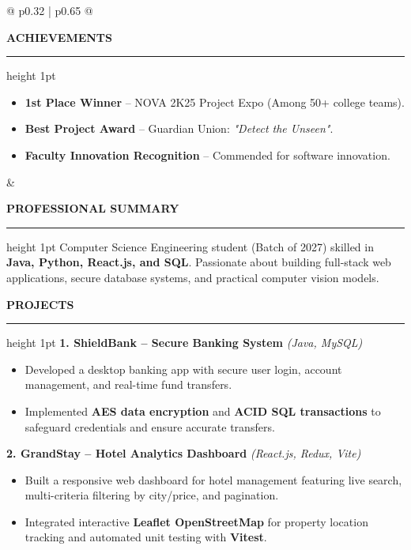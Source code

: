 \documentclass[a4paper,10pt]{article}
\begin{document}
\begin{mdframed}[style=resumebox]
\begin{tabularx}{\textwidth}{@{} p{0.32\textwidth} | p{0.65\textwidth} @{}}
\begin{minipage}[t]{\linewidth}
    \vspace{8pt}
    \textbf{\color{primaryblack}\large ACHIEVEMENTS}
    \vspace{2pt}\hrule height 1pt\vspace{3pt}
    \begin{itemize}
        \item \textbf{1st Place Winner} -- NOVA 2K25 Project Expo (Among 50+ college teams).
        \item \textbf{Best Project Award} -- Guardian Union: \textit{"Detect the Unseen"}.
        \item \textbf{Faculty Innovation Recognition} -- Commended for software innovation.
    \end{itemize}
\end{minipage}
&
\begin{minipage}[t]{\linewidth}
    \textbf{\color{primaryblack}\large PROFESSIONAL SUMMARY}
    \vspace{2pt}\hrule height 1pt\vspace{3pt}
    \small
    Computer Science Engineering student (Batch of 2027) skilled in \textbf{Java, Python, React.js, and SQL}. Passionate about building full-stack web applications, secure database systems, and practical computer vision models.

    \vspace{6pt}
    \textbf{\color{primaryblack}\large PROJECTS}
    \vspace{2pt}\hrule height 1pt\vspace{3pt}
    \textbf{1. ShieldBank -- Secure Banking System} \hfill \textit{\footnotesize (Java, MySQL)}\\
    \begin{itemize}
        \item Developed a desktop banking app with secure user login, account management, and real-time fund transfers.
        \item Implemented \textbf{AES data encryption} and \textbf{ACID SQL transactions} to safeguard credentials and ensure accurate transfers.
    \end{itemize}
    \vspace{2pt}\dotfill\vspace{2pt}

    \textbf{2. GrandStay -- Hotel Analytics Dashboard} \hfill \textit{\footnotesize (React.js, Redux, Vite)}\\
    \begin{itemize}
        \item Built a responsive web dashboard for hotel management featuring live search, multi-criteria filtering by city/price, and pagination.
        \item Integrated interactive \textbf{Leaflet OpenStreetMap} for property location tracking and automated unit testing with \textbf{Vitest}.
    \end{itemize}
    \vspace{2pt}\dotfill\vspace{2pt}


\end{minipage}
\end{tabularx}
\end{mdframed}
\end{document}

